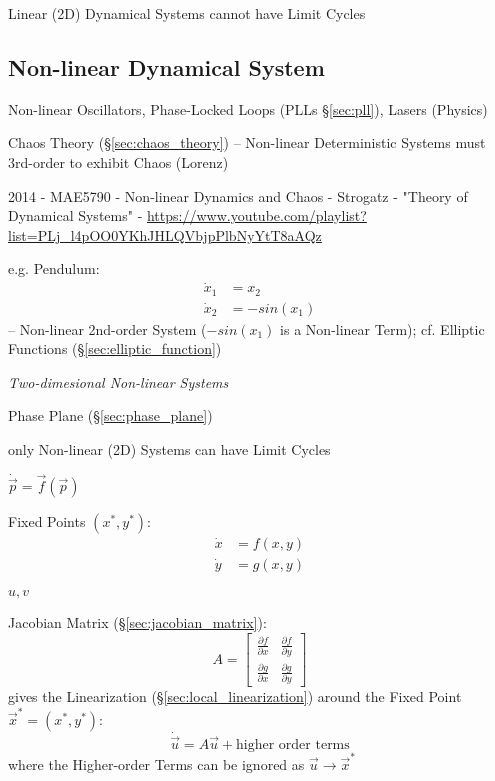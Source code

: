 Linear (2D) Dynamical Systems cannot have Limit Cycles



\subsection{Non-linear Dynamical System}\label{sec:nonlinear_dynamical_system}

Non-linear Oscillators, Phase-Locked Loops (PLLs \S\ref{sec:pll}), Lasers
(Physics)

\fist Chaos Theory (\S\ref{sec:chaos_theory}) -- Non-linear Deterministic
Systems must 3rd-order to exhibit Chaos (Lorenz)

2014 - MAE5790 - Non-linear Dynamics and Chaos - Strogatz - "Theory of
Dynamical Systems" -
\url{https://www.youtube.com/playlist?list=PLj_l4pOO0YKhJHLQVbjpPlbNyYtT8aAQz}

e.g. Pendulum:
\begin{align*}
  \dot{x}_1 & = x_2 \\
  \dot{x}_2 & = -sin(x_1)
\end{align*}
-- Non-linear 2nd-order System ($-sin(x_1)$ is a Non-linear Term); cf. Elliptic
Functions
(\S\ref{sec:elliptic_function})

\emph{Two-dimesional Non-linear Systems}

\fist Phase Plane (\S\ref{sec:phase_plane})

only Non-linear (2D) Systems can have Limit Cycles

$\dot{\vec{p}} = \vec{f}(\vec{p})$

Fixed Points $(x^*,y^*)$:
\begin{align*}
  \dot{x} & = f(x,y) \\
  \dot{y} & = g(x,y)
\end{align*}

$u, v$

Jacobian Matrix (\S\ref{sec:jacobian_matrix}):
\[
  A = \begin{bmatrix}
    \frac{\partial{f}}{\partial{x}} & \frac{\partial{f}}{\partial{y}} \\
    \frac{\partial{g}}{\partial{x}} & \frac{\partial{g}}{\partial{y}}
  \end{bmatrix}
\]
gives the Linearization (\S\ref{sec:local_linearization}) around the Fixed
Point $\vec{x}^* = (x^*, y^*)$:
\[
  \dot{\vec{u}} = A \vec{u} + \text{higher order terms}
\]
where the Higher-order Terms can be ignored as $\vec{u} \rightarrow \vec{x}^*$

